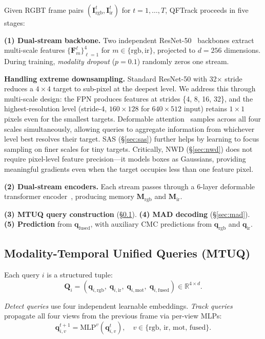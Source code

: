 \documentclass[10pt,twocolumn,letterpaper]{article}
\begin{document}
Given RGBT frame pairs $(\mathbf{I}_\text{rgb}^t, \mathbf{I}_\text{ir}^t)$ for $t=1,\ldots,T$, QFTrack proceeds in five stages:

\textbf{(1) Dual-stream backbone.}
Two independent ResNet-50~\cite{resnet} backbones extract multi-scale features $\{\mathbf{F}_m^\ell\}_{\ell=1}^4$ for $m\!\in\!\{\text{rgb},\text{ir}\}$, projected to $d\!=\!256$ dimensions.
During training, \textit{modality dropout} ($p\!=\!0.1$) randomly zeros one stream.

\textbf{Handling extreme downsampling.} Standard ResNet-50 with 32$\times$ stride reduces a $4\!\times\!4$ target to sub-pixel at the deepest level.
We address this through multi-scale design: the FPN produces features at strides \{4, 8, 16, 32\}, and the highest-resolution level (stride-4, $160\!\times\!128$ for $640\!\times\!512$ input) retains $1\!\times\!1$ pixels even for the smallest targets.
Deformable attention~\cite{deformable_detr} samples across all four scales simultaneously, allowing queries to aggregate information from whichever level best resolves their target.
SAS (\S\ref{sec:sas}) further helps by learning to focus sampling on finer scales for tiny targets.
Critically, NWD (\S\ref{sec:nwd}) does not require pixel-level feature precision---it models boxes as Gaussians, providing meaningful gradients even when the target occupies less than one feature pixel.

\textbf{(2) Dual-stream encoders.}
Each stream passes through a 6-layer deformable transformer encoder~\cite{deformable_detr}, producing memory $\mathbf{M}_\text{rgb}$ and $\mathbf{M}_\text{ir}$.

\textbf{(3) MTUQ query construction} (\S\ref{sec:mtuq}).
\textbf{(4) MAD decoding} (\S\ref{sec:mad}).
\textbf{(5) Prediction} from $\mathbf{q}_\text{fused}$, with auxiliary CMC predictions from $\mathbf{q}_\text{rgb}$ and $\mathbf{q}_\text{ir}$.

\subsection{Modality-Temporal Unified Queries (MTUQ)}
\label{sec:mtuq}

Each query $i$ is a structured tuple:
\begin{equation}
\mathbf{Q}_i = (\mathbf{q}_{i,\text{rgb}},\;\mathbf{q}_{i,\text{ir}},\;\mathbf{q}_{i,\text{mot}},\;\mathbf{q}_{i,\text{fused}}) \in \mathbb{R}^{4 \times d}.
\end{equation}

\textit{Detect queries} use four independent learnable embeddings.
\textit{Track queries} propagate all four views from the previous frame via per-view MLPs:
\begin{equation}
\mathbf{q}_{i,v}^{t+1} = \text{MLP}^v(\mathbf{q}_{i,v}^{t}),\quad v \in \{\text{rgb, ir, mot, fused}\}.
\end{equation}
\end{document}
